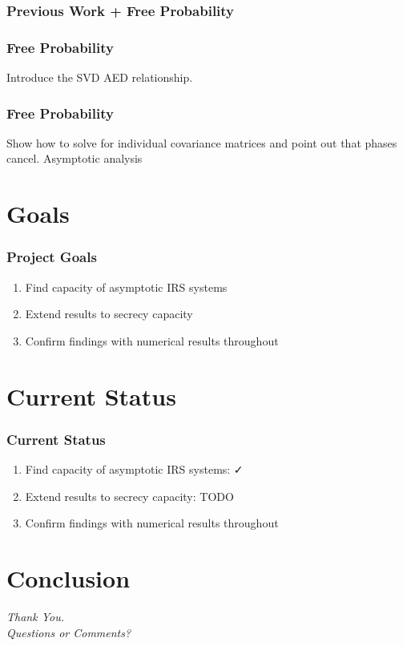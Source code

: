 \documentclass[10pt,tgadventor, onlymath]{beamer}
\begin{document}
\subsubsection{Previous Work + Free Probability}
\begin{frame}
\frametitle{Free Probability}
Introduce the SVD AED relationship.
\end{frame}

\begin{frame}
\frametitle{Free Probability}
Show how to solve for individual covariance matrices and point out that phases cancel.
Asymptotic analysis
\end{frame}


\section{Goals}
\begin{frame}
\frametitle{Project Goals}
\begin{enumerate}
\item
	Find capacity of asymptotic IRS systems
\item
	Extend results to secrecy capacity
\item 
	Confirm findings with numerical results throughout
\end{enumerate}
\end{frame}

\section{Current Status}
\begin{frame}
\frametitle{Current Status}
\begin{enumerate}
\item
	Find capacity of asymptotic IRS systems: \faCheck
\item
	Extend results to secrecy capacity: TODO
\item 
	Confirm findings with numerical results throughout
\end{enumerate}

\end{frame}


\section{Conclusion}

\begin{frame}
  \centering \Large
  \emph{Thank You.}
  \\
	\bigskip
    \centering \Large
  \emph{Questions or Comments?}

\end{frame}
\end{document}
